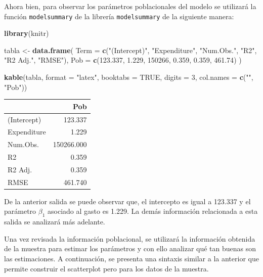 \documentclass[
  spanish,
  12pt,
]{book}
\newenvironment{Shaded}{\begin{snugshade}}{\end{snugshade}}
\newcommand{\AttributeTok}[1]{\textcolor[rgb]{0.13,0.29,0.53}{#1}}
\newcommand{\ConstantTok}[1]{\textcolor[rgb]{0.56,0.35,0.01}{#1}}
\newcommand{\DecValTok}[1]{\textcolor[rgb]{0.00,0.00,0.81}{#1}}
\newcommand{\FloatTok}[1]{\textcolor[rgb]{0.00,0.00,0.81}{#1}}
\newcommand{\FunctionTok}[1]{\textcolor[rgb]{0.13,0.29,0.53}{\textbf{#1}}}
\newcommand{\NormalTok}[1]{#1}
\newcommand{\OtherTok}[1]{\textcolor[rgb]{0.56,0.35,0.01}{#1}}
\newcommand{\StringTok}[1]{\textcolor[rgb]{0.31,0.60,0.02}{#1}}
\begin{document}
Ahora bien, para observar los parámetros poblacionales del modelo se utilizará la función \texttt{modelsummary} de la librería \texttt{modelsummary} de la siguiente manera:

\begin{Shaded}
\begin{Highlighting}[]
\FunctionTok{library}\NormalTok{(knitr)}
 
\NormalTok{tabla }\OtherTok{\textless{}{-}} \FunctionTok{data.frame}\NormalTok{(}
  \AttributeTok{Term =} \FunctionTok{c}\NormalTok{(}\StringTok{"(Intercept)"}\NormalTok{, }\StringTok{"Expenditure"}\NormalTok{, }\StringTok{"Num.Obs."}\NormalTok{, }\StringTok{"R2"}\NormalTok{, }\StringTok{"R2 Adj."}\NormalTok{, }\StringTok{"RMSE"}\NormalTok{),}
  \AttributeTok{Pob =} \FunctionTok{c}\NormalTok{(}\FloatTok{123.337}\NormalTok{, }\FloatTok{1.229}\NormalTok{, }\DecValTok{150266}\NormalTok{, }\FloatTok{0.359}\NormalTok{, }\FloatTok{0.359}\NormalTok{, }\FloatTok{461.74}\NormalTok{)}
\NormalTok{)}
 
\FunctionTok{kable}\NormalTok{(tabla, }
      \AttributeTok{format =} \StringTok{"latex"}\NormalTok{, }
      \AttributeTok{booktabs =} \ConstantTok{TRUE}\NormalTok{, }
      \AttributeTok{digits =} \DecValTok{3}\NormalTok{,}
      \AttributeTok{col.names =} \FunctionTok{c}\NormalTok{(}\StringTok{""}\NormalTok{, }\StringTok{"Pob"}\NormalTok{))}
\end{Highlighting}
\end{Shaded}

\begin{tabular}{lr}
\toprule
 & Pob\\
\midrule
(Intercept) & 123.337\\
Expenditure & 1.229\\
Num.Obs. & 150266.000\\
R2 & 0.359\\
R2 Adj. & 0.359\\
\addlinespace
RMSE & 461.740\\
\bottomrule
\end{tabular}

De la anterior salida se puede observar que, el intercepto es igual a 123.337 y el parámetro \(\beta_{1}\) asociado al gasto es 1.229. La demás información relacionada a esta salida se analizará más adelante.

Una vez revisada la información poblacional, se utilizará la información obtenida de la muestra para estimar los parámetros y con ello analizar qué tan buenas son las estimaciones. A continuación, se presenta una sintaxis similar a la anterior que permite construir el scatterplot pero para los datos de la muestra.
\end{document}
